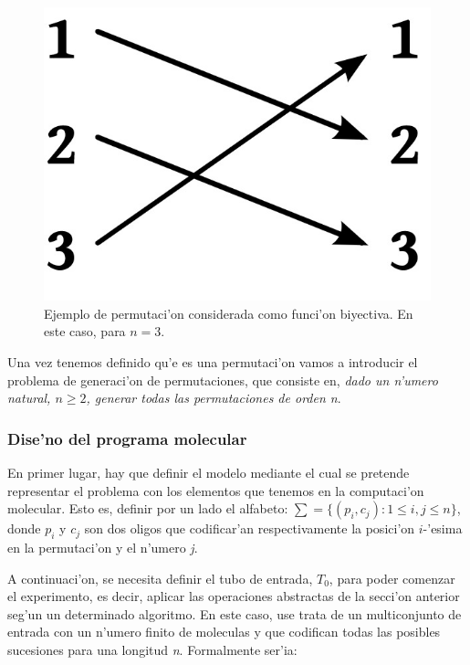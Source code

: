 \documentclass[12pt]{article}
\begin{document}
\begin{figure}[h]
\centering
\includegraphics[scale=0.6]{permutaciones}
\caption{Ejemplo de permutaci'on considerada como funci'on biyectiva. En este caso, para $n = 3$.}
\end{figure}

Una vez tenemos definido qu'e es una permutaci'on vamos a introducir el problema de generaci'on de
permutaciones, que consiste en, \textit{dado un n'umero natural, $n \geq 2$, generar todas las permutaciones
 de orden n}.

\subsubsection{Dise'no del programa molecular}

En primer lugar, hay que definir el modelo mediante el cual se pretende representar el problema con los
elementos que tenemos en la computaci'on molecular. Esto es, definir por un lado el alfabeto:
$ \sum = \{(p_{i},c_{j}) : 1 \leq i,j \leq n\} $, donde $p_{i}$ y $c_{j}$ son dos oligos que codificar'an
respectivamente la posici'on $i$-'esima en la permutaci'on y el n'umero \textit{j}.

A continuaci'on, se necesita definir el tubo de entrada, $T_{0}$, para poder comenzar el experimento, es decir,
aplicar las operaciones abstractas de la secci'on anterior seg'un un determinado algoritmo. En este caso,
use trata de un multiconjunto de entrada con un n'umero finito de moleculas y que codifican todas las
posibles sucesiones para una longitud \textit{n}. Formalmente ser'ia:
\end{document}
